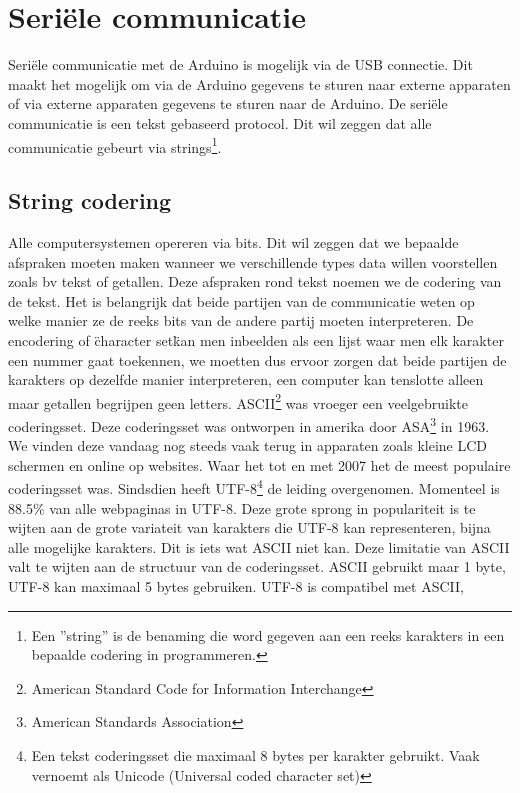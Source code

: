 \documentclass[11pt]{report}
\newcommand{\pbr}{\hfill\break\hfill\break}
\newcommand{\lbr}{\hfill\break}
\begin{document}
\section{Seriële communicatie}
Seriële communicatie met de Arduino is mogelijk via de USB connectie. Dit maakt het mogelijk om via de Arduino gegevens te sturen naar externe apparaten of via externe apparaten gegevens te sturen naar de Arduino.
\pbr
De seriële communicatie is een tekst gebaseerd protocol. Dit wil zeggen dat alle communicatie gebeurt via strings\footnote{Een ''string'' is de benaming die word gegeven aan een reeks karakters in een bepaalde codering in programmeren.}.\lbr
\subsection{String codering}
Alle computersystemen opereren via bits. Dit wil zeggen dat we bepaalde afspraken moeten maken wanneer we verschillende types data willen voorstellen zoals bv tekst of getallen. Deze afspraken rond tekst noemen we de codering van de tekst. Het is belangrijk dat beide partijen van de communicatie weten op welke manier ze de reeks bits van de andere partij moeten interpreteren. De encodering of \"character set\" kan men inbeelden als een lijst waar men elk karakter een nummer gaat toekennen, we moetten dus ervoor zorgen dat beide partijen de karakters op dezelfde manier interpreteren, een computer kan tenslotte alleen maar getallen begrijpen geen letters.
\pbr
ASCII\footnote{American Standard Code for Information Interchange} was vroeger een veelgebruikte coderingsset. Deze coderingsset was ontworpen in amerika door ASA\footnote{American Standards Association} in 1963. We vinden deze vandaag nog steeds vaak terug in apparaten zoals kleine LCD schermen en online op websites. Waar het tot en met 2007 het de meest populaire coderingsset was. Sindsdien heeft UTF-8\footnote{Een tekst coderingsset die maximaal 8 bytes per karakter gebruikt. Vaak vernoemt als Unicode (Universal coded character set)} de leiding overgenomen. Momenteel is 88.5\% van alle webpaginas in UTF-8\cite{w3techs2017}. Deze grote sprong in populariteit is te wijten aan de grote variateit van karakters die UTF-8 kan representeren, bijna alle mogelijke karakters. Dit is iets wat ASCII niet kan. Deze limitatie van ASCII valt te wijten aan de structuur van de coderingsset. ASCII gebruikt maar 1 byte, UTF-8 kan maximaal 5 bytes gebruiken.
\pbr
UTF-8 is compatibel met ASCII, %
\end{document}
